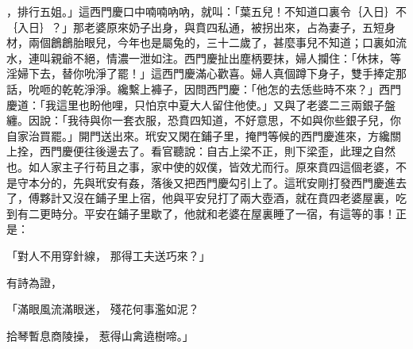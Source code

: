 ，排行五姐。」這西門慶口中喃喃吶吶，就叫：「葉五兒！不知道口裏令｛入日｝不｛入日｝？」那老婆原來奶子出身，與賁四私通，被拐出來，占為妻子，五短身材，兩個鶬鶬胎眼兒，今年也是屬兔的，三十二歲了，甚麼事兒不知道；口裏如流水，連叫親爺不絕，情濃一泄如注。西門慶扯出塵柄要抹，婦人攔住：「休抹，等淫婦下去，替你吮淨了罷！」這西門慶滿心歡喜。婦人真個蹲下身子，雙手捧定那話，吮咂的乾乾淨淨。纔繫上褲子，因問西門慶：「他怎的去恁些時不來？」西門慶道：「我這里也盼他哩，只怕京中夏大人留住他使。」又與了老婆二三兩銀子盤纏。因說：「我待與你一套衣服，恐賁四知道，不好意思，不如與你些銀子兒，你自家治買罷。」開門送出來。玳安又閑在鋪子里，掩門等候的西門慶進來，方纔關上拴，西門慶便往後邊去了。看官聽說：自古上梁不正，則下梁歪，此理之自然也。如人家主子行苟且之事，家中使的奴僕，皆效尤而行。原來賁四這個老婆，不是守本分的，先與玳安有姦，落後又把西門慶勾引上了。這玳安剛打發西門慶進去了，傅夥計又沒在鋪子里上宿，他與平安兒打了兩大壺酒，就在賁四老婆屋裏，吃到有二更時分。平安在鋪子里歇了，他就和老婆在屋裏睡了一宿，有這等的事！正是：

「對人不用穿針線，  那得工夫送巧來？」

有詩為證，

「滿眼風流滿眼迷，  殘花何事濫如泥？

拾琴暫息商陵操，  惹得山禽遶樹啼。」

